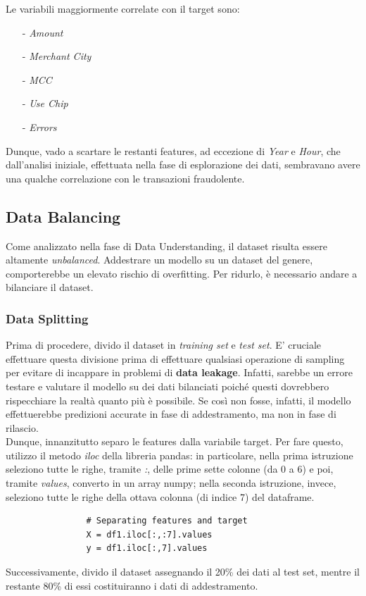 \documentclass[]{article}
\begin{document}
        Le variabili maggiormente correlate con il target sono:
        \begin{itemize}
            \item [-] \textit{Amount}
            \item [-] \textit{Merchant City}
            \item [-] \textit{MCC}
            \item [-] \textit{Use Chip}
            \item [-] \textit{Errors}
        \end{itemize}
        Dunque, vado a scartare le restanti features, ad eccezione di \textit{Year} e \textit{Hour}, che dall'analisi iniziale, effettuata nella fase di esplorazione dei dati, sembravano avere una qualche correlazione con le transazioni fraudolente.
    \subsection{Data Balancing}
        Come analizzato nella fase di Data Understanding, il dataset risulta essere altamente \textit{unbalanced}. Addestrare un modello su un dataset del genere, comporterebbe un elevato rischio di overfitting. Per ridurlo, è necessario andare a bilanciare il dataset.
        \subsubsection{Data Splitting}
            Prima di procedere, divido il dataset in \textit{training set} e \textit{test set}. E' cruciale effettuare questa divisione prima di effettuare qualsiasi operazione di sampling per evitare di incappare in problemi di \textbf{data leakage}. Infatti, sarebbe un errore testare e valutare il modello su dei dati bilanciati poiché questi dovrebbero rispecchiare la realtà quanto più è possibile. Se così non fosse, infatti, il modello effettuerebbe predizioni accurate in fase di addestramento, ma non in fase di rilascio.\\
            Dunque, innanzitutto separo le features dalla variabile target. Per fare questo, utilizzo il metodo \textit{iloc} della libreria pandas: in particolare, nella prima istruzione seleziono tutte le righe, tramite \textit{:}, delle prime sette colonne (da 0 a 6) e poi, tramite \textit{values}, converto in un array numpy; nella seconda istruzione, invece, seleziono tutte le righe della ottava colonna (di indice 7)  del dataframe.
            \begin{verbatim}
                # Separating features and target
                X = df1.iloc[:,:7].values
                y = df1.iloc[:,7].values
            \end{verbatim}
            Successivamente, divido il dataset assegnando il 20\% dei dati al test set, mentre il restante 80\% di essi costituiranno i dati di addestramento.
\end{document}
